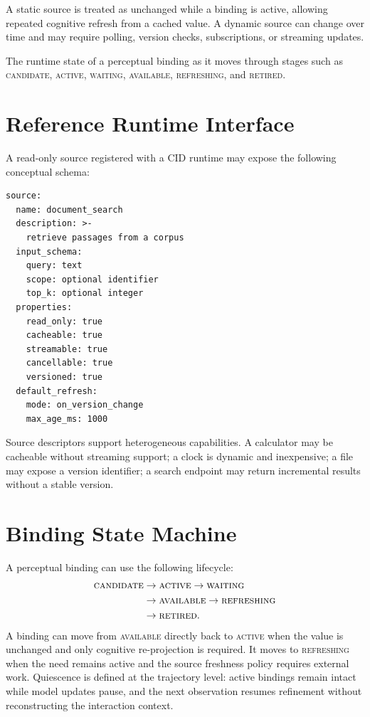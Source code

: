 \begin{description}[leftmargin=0pt,labelindent=0pt,itemsep=2pt,topsep=3pt]
  \item[Static and dynamic sources.]
  A static source is treated as unchanged while a binding is active, allowing repeated cognitive refresh from a cached value. A dynamic source can change over time and may require polling, version checks, subscriptions, or streaming updates.

  \item[Binding lifecycle.]
  The runtime state of a perceptual binding as it moves through stages such as \textsc{candidate}, \textsc{active}, \textsc{waiting}, \textsc{available}, \textsc{refreshing}, and \textsc{retired}.
\end{description}

\section{Reference Runtime Interface}
\label{app:runtime-interface}

A read-only source registered with a CID runtime may expose the following conceptual schema:

\begin{verbatim}
source:
  name: document_search
  description: >-
    retrieve passages from a corpus
  input_schema:
    query: text
    scope: optional identifier
    top_k: optional integer
  properties:
    read_only: true
    cacheable: true
    streamable: true
    cancellable: true
    versioned: true
  default_refresh:
    mode: on_version_change
    max_age_ms: 1000
\end{verbatim}

Source descriptors support heterogeneous capabilities. A calculator may be cacheable without streaming support; a clock is dynamic and inexpensive; a file may expose a version identifier; a search endpoint may return incremental results without a stable version.

\section{Binding State Machine}
\label{app:binding-state}

A perceptual binding can use the following lifecycle:
\begin{align}
  \textsc{candidate} &\rightarrow \textsc{active}
  \rightarrow \textsc{waiting} \notag\\
  &\rightarrow \textsc{available}
  \rightarrow \textsc{refreshing} \notag\\
  &\rightarrow \textsc{retired}.
\end{align}
A binding can move from \textsc{available} directly back to \textsc{active} when the value is unchanged and only cognitive re-projection is required. It moves to \textsc{refreshing} when the need remains active and the source freshness policy requires external work. Quiescence is defined at the trajectory level: active bindings remain intact while model updates pause, and the next observation resumes refinement without reconstructing the interaction context.

